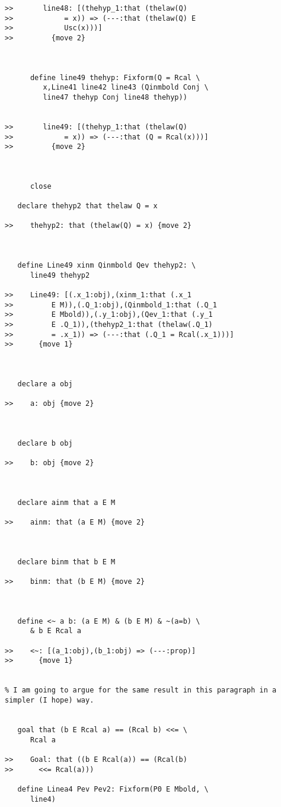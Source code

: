 \documentclass[12pt]{article}
\begin{document}
\begin{verbatim}
>>       line48: [(thehyp_1:that (thelaw(Q)
>>            = x)) => (---:that (thelaw(Q) E
>>            Usc(x)))]
>>         {move 2}



      define line49 thehyp: Fixform(Q = Rcal \
         x,Line41 line42 line43 (Qinmbold Conj \
         line47 thehyp Conj line48 thehyp))


>>       line49: [(thehyp_1:that (thelaw(Q)
>>            = x)) => (---:that (Q = Rcal(x)))]
>>         {move 2}



      close

   declare thehyp2 that thelaw Q = x

>>    thehyp2: that (thelaw(Q) = x) {move 2}



   define Line49 xinm Qinmbold Qev thehyp2: \
      line49 thehyp2

>>    Line49: [(.x_1:obj),(xinm_1:that (.x_1
>>         E M)),(.Q_1:obj),(Qinmbold_1:that (.Q_1
>>         E Mbold)),(.y_1:obj),(Qev_1:that (.y_1
>>         E .Q_1)),(thehyp2_1:that (thelaw(.Q_1)
>>         = .x_1)) => (---:that (.Q_1 = Rcal(.x_1)))]
>>      {move 1}



   declare a obj

>>    a: obj {move 2}



   declare b obj

>>    b: obj {move 2}



   declare ainm that a E M

>>    ainm: that (a E M) {move 2}



   declare binm that b E M

>>    binm: that (b E M) {move 2}



   define <~ a b: (a E M) & (b E M) & ~(a=b) \
      & b E Rcal a

>>    <~: [(a_1:obj),(b_1:obj) => (---:prop)]
>>      {move 1}


% I am going to argue for the same result in this paragraph in a simpler (I hope) way.


   goal that (b E Rcal a) == (Rcal b) <<= \
      Rcal a

>>    Goal: that ((b E Rcal(a)) == (Rcal(b)
>>      <<= Rcal(a)))

   define Linea4 Pev Pev2: Fixform(P0 E Mbold, \
      line4)


\end{verbatim}
\end{document}
